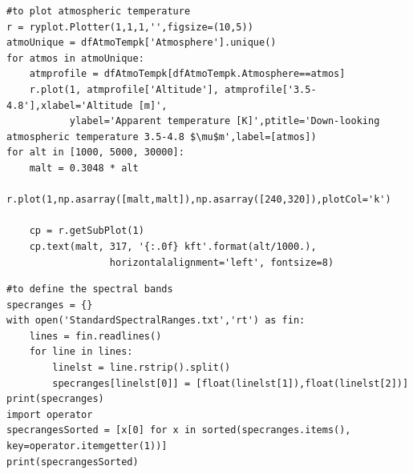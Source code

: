 \documentclass{workpackage}
\begin{document}
\begin{lstlisting}[style=incellstyle,caption={Code Listing in cell 23 \label{lst:autolistingcell23}}]
#to plot atmospheric temperature
r = ryplot.Plotter(1,1,1,'',figsize=(10,5))
atmoUnique = dfAtmoTempk['Atmosphere'].unique()
for atmos in atmoUnique:
    atmprofile = dfAtmoTempk[dfAtmoTempk.Atmosphere==atmos]
    r.plot(1, atmprofile['Altitude'], atmprofile['3.5-4.8'],xlabel='Altitude [m]',
           ylabel='Apparent temperature [K]',ptitle='Down-looking atmospheric temperature 3.5-4.8 $\mu$m',label=[atmos])
for alt in [1000, 5000, 30000]:
    malt = 0.3048 * alt
    r.plot(1,np.asarray([malt,malt]),np.asarray([240,320]),plotCol='k')
    
    cp = r.getSubPlot(1)
    cp.text(malt, 317, '{:.0f} kft'.format(alt/1000.), 
                  horizontalalignment='left', fontsize=8)
\end{lstlisting}


\begin{lstlisting}[style=incellstyle,caption={Code Listing in cell 25 \label{lst:autolistingcell25}}]
#to define the spectral bands
specranges = {}
with open('StandardSpectralRanges.txt','rt') as fin:
    lines = fin.readlines()
    for line in lines:
        linelst = line.rstrip().split()
        specranges[linelst[0]] = [float(linelst[1]),float(linelst[2])]
print(specranges)
import operator
specrangesSorted = [x[0] for x in sorted(specranges.items(), key=operator.itemgetter(1))]
print(specrangesSorted)
\end{lstlisting}
\end{document}
